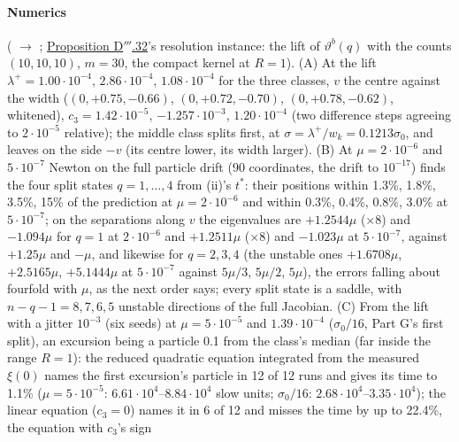 \begin{sloppypar}
\paragraph{Numerics} ( $\to$ ;
\hyperref[res:thmDppp:32]{Proposition D$'''$.32}'s resolution instance: the lift of $\vartheta^b(q)$ with the counts
$(10,10,10)$, $m = 30$, the compact kernel at $R = 1$). (A) At the lift $\lambda^+ = 1.00\cdot10^{-4}$,
$2.86\cdot10^{-4}$, $1.08\cdot10^{-4}$ for the three classes, $v$ the centre against the width ($(0,+0.75,-0.66)$,
$(0,+0.72,-0.70)$, $(0,+0.78,-0.62)$, whitened), $c_3 = 1.42\cdot10^{-5}$, $-1.257\cdot10^{-3}$, $1.20\cdot10^{-4}$
(two difference steps agreeing to $2\cdot10^{-5}$ relative); the middle class splits first, at
$\sigma = \lambda^+/w_k = 0.1213\sigma_0$, and leaves on the side $-v$ (its centre lower, its width larger). (B) At
$\mu = 2\cdot10^{-6}$ and $5\cdot10^{-7}$ Newton on the full particle drift (90 coordinates, the drift to $10^{-17}$)
finds the four split states $q = 1,\dots,4$ from (ii)'s $t^*$: their positions within 1.3\%, 1.8\%, 3.5\%, 15\% of the
prediction at $\mu = 2\cdot10^{-6}$ and within 0.3\%, 0.4\%, 0.8\%, 3.0\% at $5\cdot10^{-7}$; on the separations along
$v$ the eigenvalues are $+1.2544\mu$ ($\times8$) and $-1.094\mu$ for $q = 1$ at $2\cdot10^{-6}$ and $+1.2511\mu$
($\times8$) and $-1.023\mu$ at $5\cdot10^{-7}$, against $+1.25\mu$ and $-\mu$, and likewise for $q = 2, 3, 4$ (the
unstable ones $+1.6708\mu$, $+2.5165\mu$, $+5.1444\mu$ at $5\cdot10^{-7}$ against $5\mu/3$, $5\mu/2$, $5\mu$), the
errors falling about fourfold with $\mu$, as the next order says; every split state is a saddle, with
$n - q - 1 = 8, 7, 6, 5$ unstable directions of the full Jacobian. (C) From the lift with a jitter $10^{-3}$ (six
seeds) at $\mu = 5\cdot10^{-5}$ and $1.39\cdot10^{-4}$ ($\sigma_0/16$, Part G's first split), an excursion being a
particle 0.1 from the class's median (far inside the range $R = 1$): the reduced quadratic equation integrated from the
measured $\xi(0)$ names the first excursion's particle in 12 of 12 runs and gives its time to 1.1\%
($\mu = 5\cdot10^{-5}$: $6.61\cdot10^4$--$8.84\cdot10^4$ slow units; $\sigma_0/16$: $2.68\cdot10^4$--$3.35\cdot10^4$);
the linear equation ($c_3 = 0$) names it in 6 of 12 and misses the time by up to 22.4\%, the equation with $c_3$'s sign

\end{sloppypar}
